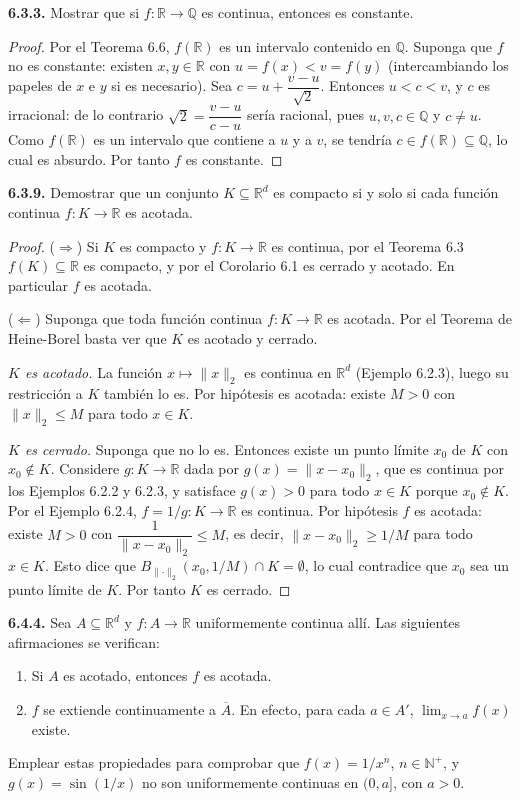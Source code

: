 \documentclass[11pt]{article}
\newcommand{\R}{\mathbb{R}}
\newcommand{\N}{\mathbb{N}}
\newcommand{\Q}{\mathbb{Q}}
\newcommand{\norm}[1]{\lVert #1\rVert}
\begin{document}
  \textbf{6.3.3.} Mostrar que si $f:\R\to\Q$ es continua, entonces es constante.

  \begin{proof}
  Por el Teorema 6.6, $f(\R)$ es un intervalo contenido en $\Q$. Suponga que $f$ no es constante: existen $x,y\in\R$ con $u=f(x)<v=f(y)$ (intercambiando los papeles de $x$ e $y$ si es necesario). Sea $c=u+\dfrac{v-u}{\sqrt2}$. Entonces $u<c<v$, y $c$ es irracional: de lo contrario $\sqrt2=\dfrac{v-u}{c-u}$ sería racional, pues $u,v,c\in\Q$ y $c\neq u$. Como $f(\R)$ es un intervalo que contiene a $u$ y a $v$, se tendría $c\in f(\R)\subseteq\Q$, lo cual es absurdo. Por tanto $f$ es constante.
  \end{proof}

  \textbf{6.3.9.} Demostrar que un conjunto $K\subseteq\R^d$ es compacto si y solo si cada función continua $f:K\to\R$ es acotada.

  \begin{proof}
  ($\Rightarrow$) Si $K$ es compacto y $f:K\to\R$ es continua, por el Teorema 6.3 $f(K)\subseteq\R$ es compacto, y por el Corolario 6.1 es cerrado y acotado. En particular $f$ es acotada.

  ($\Leftarrow$) Suponga que toda función continua $f:K\to\R$ es acotada. Por el Teorema de Heine-Borel basta ver que $K$ es acotado y cerrado.

  \emph{$K$ es acotado.} La función $x\mapsto\norm{x}_2$ es continua en $\R^d$ (Ejemplo 6.2.3), luego su restricción a $K$ también lo es. Por hipótesis es acotada: existe $M>0$ con $\norm{x}_2\le M$ para todo $x\in K$.

  \emph{$K$ es cerrado.} Suponga que no lo es. Entonces existe un punto límite $x_0$ de $K$ con $x_0\notin K$. Considere $g:K\to\R$ dada por $g(x)=\norm{x-x_0}_2$, que es continua por los Ejemplos 6.2.2 y 6.2.3, y satisface $g(x)>0$ para todo $x\in K$ porque $x_0\notin K$. Por el Ejemplo 6.2.4, $f=1/g:K\to\R$ es continua. Por hipótesis $f$ es acotada: existe $M>0$ con $\dfrac{1}{\norm{x-x_0}_2}\le M$, es decir, $\norm{x-x_0}_2\ge 1/M$ para todo $x\in K$. Esto dice que $B_{\norm{\cdot}_2}(x_0,1/M)\cap K=\emptyset$, lo cual contradice que $x_0$ sea un punto límite de $K$. Por tanto $K$ es cerrado.
  \end{proof}

  \textbf{6.4.4.} Sea $A\subseteq\R^d$ y $f:A\to\R$ uniformemente continua allí. Las siguientes afirmaciones se verifican:
  \begin{enumerate}
  \item Si $A$ es acotado, entonces $f$ es acotada.
  \item $f$ se extiende continuamente a $\overline{A}$. En efecto, para cada $a\in A'$, $\lim_{x\to a}f(x)$ existe.
  \end{enumerate}
  Emplear estas propiedades para comprobar que $f(x)=1/x^n$, $n\in\N^+$, y $g(x)=\sin(1/x)$ no son uniformemente continuas en $(0,a]$, con $a>0$.
\end{document}
